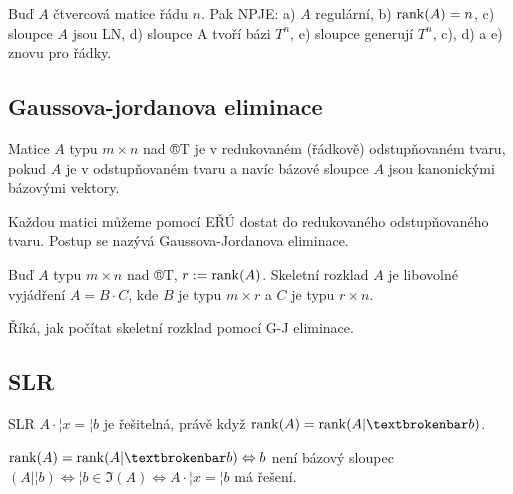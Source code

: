 \documentclass[12pt]{article}					%
\begin{document}
        \begin{poznamka}
                Buď $A$ čtvercová matice řádu $n$. Pak NPJE: a) $A$ regulární, b) $\operatorname{rank}(A) = n$, c) sloupce $A$ jsou LN, d) sloupce A tvoří bázi $T^n$, e) sloupce generují $T^n$, c), d) a e) znovu pro řádky.
        \end{poznamka}

    \subsection{Gaussova-jordanova eliminace}
        \begin{definice}
            Matice $A$ typu $m \times n$ nad ®T je v redukovaném (řádkově) odstupňovaném tvaru, pokud $A$ je v odstupňovaném tvaru a navíc bázové sloupce $A$ jsou kanonickými bázovými vektory.
        \end{definice}

        \begin{poznamka}[Pozorování]
            Každou matici můžeme pomocí EŘÚ dostat do redukovaného odstupňovaného tvaru. Postup se nazývá Gaussova-Jordanova eliminace.
        \end{poznamka}

        \begin{definice}
            Buď $A$ typu $m \times n$ nad ®T, $r:=\operatorname{rank}(A)$. Skeletní rozklad $A$ je libovolné vyjádření $A=B·C$, kde $B$ je typu $m \times r$ a $C$ je typu $r \times n$.
        \end{definice}

        \begin{veta}
            Říká, jak počítat skeletní rozklad pomocí G-J eliminace.
        \end{veta}

    \subsection{SLR}
        \begin{veta}[Frobeniova]
            SLR $A·¦x = ¦b$ je řešitelná, právě když $\rank(A) = \rank(A|¦b)$.

            \begin{dukazin}
                $\rank(A) = \rank(A|¦b) \Leftrightarrow b$ není bázový sloupec $(A|¦b) \Leftrightarrow ¦b \in \Im(A) \Leftrightarrow A·¦x = ¦b$ má řešení.
            \end{dukazin}
        \end{veta}
\end{document}
